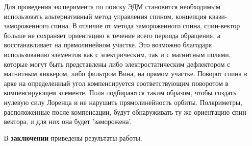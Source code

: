 \par Для проведения эксперимента по поиску ЭДМ становится необходимым использовать альтернативный метод управления спином, концепция квази-замороженного спина. В отличие от метода замороженного спина, спин-вектор больше не сохраняет ориентацию в течение всего периода обращения, а восстанавливает на прямолинейном участке. Это возможно благодаря использованию элементов как с электрическим, так и с магнитным полями, которые могут быть представлены либо электростатическим дефлектором с магнитным киккером, либо фильтром Вина, на прямом участке. Поворот спина в арке на определенный угол компенсируется соответствующим поворотом в компенсирующем элементе. Поля подбираются таким образом, чтобы создать нулевую силу Лоренца и не нарушить прямолинейность орбиты. Поляриметры, расположенные после компенсации, будут обнаруживать ту же ориентацию спин-вектора, и для них она будет 'заморожена'.

В \textbf{заключении} приведены результаты работы.